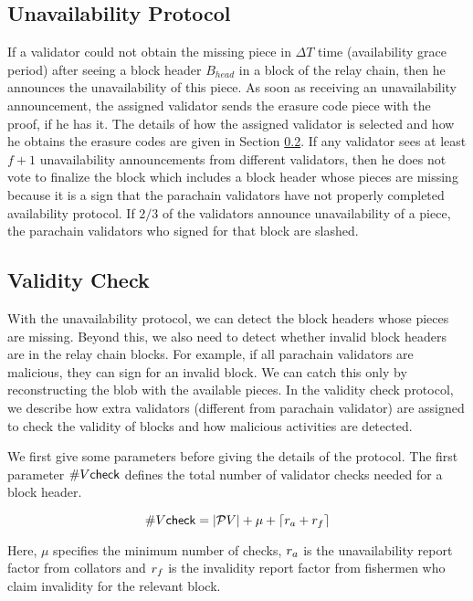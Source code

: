 \subsection{Unavailability Protocol}
\label{sec:unavail}
If a validator could not obtain the missing piece in $\Delta T$ time (availability grace period) after seeing a block header $B_{head}$ in a block of the relay chain, then he announces the unavailability of this piece. As soon as receiving an unavailability announcement, the assigned validator sends the erasure code piece with the proof, if he has it. The details of how the assigned validator is selected and how he obtains the erasure codes are given in Section \ref{sec:validitycheck}. If any validator sees at least $f+1$ unavailability announcements from different validators, then he does not vote to finalize the block which includes a block header whose pieces are missing  because it is a sign that the parachain validators have not properly completed availability protocol. If $2/3$ of the validators announce unavailability of a piece, the parachain validators who signed for that block are slashed. 




\subsection{Validity Check}
\label{sec:validitycheck}
With the unavailability protocol, we can detect the block headers whose pieces are missing. Beyond this, we also need to detect whether invalid block headers are in the relay chain blocks. For example, if all parachain validators are malicious, they can sign for an invalid block. We can catch this only by reconstructing the blob with the available pieces. In the validity check protocol, we describe how extra validators (different from parachain validator) are assigned to check the validity of blocks and how malicious activities are detected.


We first give some parameters before giving the details of the protocol.
The first parameter $\#V\mathsf{check}$ defines the total number of validator checks needed for a block header.

$$\#V\mathsf{check} = |\mathcal{P}V| + \mu +\lceil r_{a} + r_{f} \rceil$$

Here, $\mu$ specifies the minimum number of checks, $r_{a}$ is the unavailability report factor from collators and $r_{f}$ is the invalidity report factor from fishermen who claim invalidity for the relevant block. 


